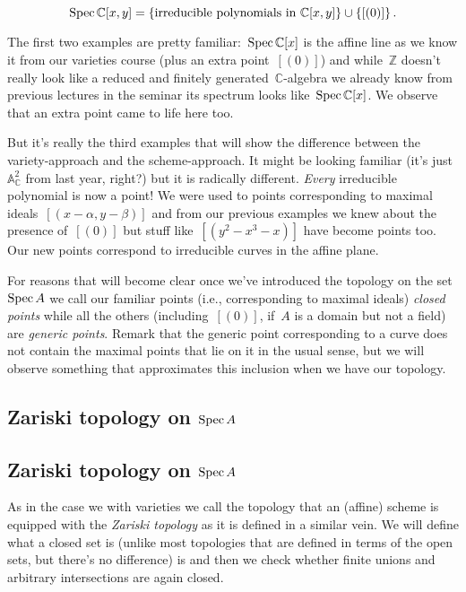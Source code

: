\begin{example}
  \begin{equation}
    \operatorname{Spec}\mathbb{C}[x,y]=\left\{ \text{irreducible polynomials in~$\mathbb{C}[x,y]$} \right\}\cup\left\{ [(0)] \right\}.
  \end{equation}
\end{example}

The first two examples are pretty familiar:~$\operatorname{Spec}\mathbb{C}[x]$ is the affine line as we know it from our varieties course (plus an extra point~$[(0)]$) and while~$\mathbb{Z}$ doesn't really look like a reduced and finitely generated~$\mathbb{C}$-algebra we already know from previous lectures in the seminar its spectrum looks like~$\operatorname{Spec}\mathbb{C}[x]$. We observe that an extra point came to life here too.

But it's really the third examples that will show the difference between the variety-approach and the scheme-approach. It might be looking familiar (it's just~$\mathbb{A}^2_{\mathbb{C}}$ from last year, right?) but it is radically different. \emph{Every} irreducible polynomial is now a point! We were used to points corresponding to maximal ideals~$[(x-\alpha,y-\beta)]$ and from our previous examples we knew about the presence of~$[(0)]$ but stuff like~$[(y^2-x^3-x)]$ have become points too. Our new points correspond to irreducible curves in the affine plane.

For reasons that will become clear once we've introduced the topology on the set~$\operatorname{Spec} A$ we call our familiar points (i.e., corresponding to maximal ideals) \emph{closed points} while all the others (including~$[(0)]$, if~$A$ is a domain but not a field) are \emph{generic points}. Remark that the generic point corresponding to a curve does not contain the maximal points that lie on it in the usual sense, but we will observe something that approximates this inclusion when we have our topology.

\iftex
\subsection[Zariski topology on Spec A]{Zariski topology on $\operatorname{Spec} A$}
\fi
\ifblog
\subsection{Zariski topology on $\operatorname{Spec} A$}
\fi
As in the case we with varieties we call the topology that an (affine) scheme is equipped with the \emph{Zariski topology} as it is defined in a similar vein. We will define what a closed set is (unlike most topologies that are defined in terms of the open sets, but there's no difference) is and then we check whether finite unions and arbitrary intersections are again closed.

